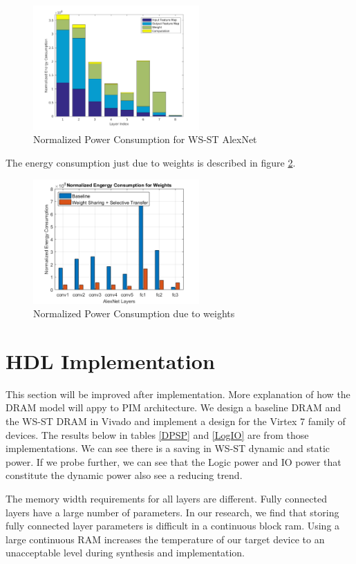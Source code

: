 \documentclass[conference]{IEEEtran}
\begin{document}
\begin{figure}[!ht]
\centering
\includegraphics[width=2.5in]{EnergyVisualization_WSAlexNet}
\caption{Normalized Power Consumption for WS-ST AlexNet}
\label{Power_Est_2}
\end{figure}

The energy consumption just due to weights is described in figure \ref{Power_Est_3}. 

\begin{figure}[!ht]
\centering
\includegraphics[width=2.5in]{Power_Est}
\caption{Normalized Power Consumption due to weights}
\label{Power_Est_3}
\end{figure}

\section{HDL Implementation}

\color{magenta} This section will be improved after implementation. More explanation of how the DRAM model will appy to PIM architecture.
\color{black}
We design a baseline DRAM and the WS-ST DRAM in Vivado and implement a design for the Virtex 7 family of devices. The results below in tables \ref{DPSP} and \ref{LogIO} are from those implementations. We can see there is a saving in WS-ST dynamic and static power. If we probe further, we can see that the Logic power and IO power that constitute the dynamic power also see a reducing trend. 

The memory width requirements for all layers are different. Fully connected layers have a large number of parameters. In our research, we find that storing fully connected layer parameters is difficult in a continuous block ram. Using a large continuous RAM increases the temperature of our target device to an unacceptable level during synthesis and implementation. 
\end{document}
